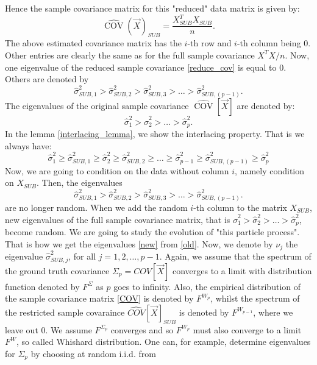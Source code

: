 \documentclass[12pt]{amsart}
\theoremstyle{definition}
\DeclareMathOperator{\Cov}{COV}
\numberwithin{equation}{section}
\numberwithin{equation}{section}
\theoremstyle{remark}
\numberwithin{equation}{section}
\begin{document}
Hence the sample covariance matrix for this
"reduced" data matrix
is given by:
\begin{equation}
\label{reduce_cov}
\hat{\Cov}(\vec{X})_{SUB}=\frac{X_{SUB}^T X_{SUB}}{n}.
\end{equation}
The above estimated covariance matrix has the $i$-th row and $i$-th column
being $0$. Other entries are clearly the same as for the full sample
covariance $X^T X/n$.
Now, one eigenvalue of the reduced sample covariance \ref{reduce_cov} is equal to $0$.
Others are denoted by	
\begin{equation}
\label{old}
\hat{\sigma}^2_{SUB,1}>\hat{\sigma}^2_{SUB,2}>\hat{\sigma}^2_{SUB,3}>\ldots>\hat{\sigma}^2_{SUB,(p-1)}.
\end{equation}
The eigenvalues of the original sample covariance $\hat{\Cov}[\vec{X}]$ are denoted by:
\begin{equation}
\label{new}
\hat{\sigma}^2_1>\hat{\sigma}^2_2>\ldots>\hat{\sigma}^2_p.
\end{equation}
In the lemma \ref{interlacing_lemma}, we show the interlacing property. That is
we always have:
$$\hat{\sigma}^2_1\geq \hat{\sigma}^2_{SUB,1}\geq
\hat{\sigma}^2_2\geq \hat{\sigma}^2_{SUB,2}\geq \ldots\geq
\hat{\sigma}^2_{p-1}\geq \hat{\sigma}^2_{SUB,(p-1)}\geq \hat{\sigma}^2_p
$$
Now, we are going to condition on the data without column $i$, namely condition on $X_{SUB}$. Then, the eigenvalues
$$\hat{\sigma}^2_{SUB,1}>\hat{\sigma}^2_{SUB,2}>\hat{\sigma}^2_{SUB,3}>\ldots>\hat{\sigma}^2_{SUB,(p-1)}.$$
are no longer random. When we add the random $i$-th column to the matrix $X_{SUB}$, new eigenvalues of the full sample covariance matrix, that is
$\hat{\sigma}^2_1>\hat{\sigma}^2_2>\ldots>\hat{\sigma}^2_p$,
become random. We are going to study the evolution of "this particle process".
That is how we get the eigenvalues \ref{new} from \ref{old}.
Now, we denote by $\nu_j$ the eigenvalue $\hat{\sigma}^2_{SUB,j}$,  for all $j=1,2,\ldots,p-1$.
Again, we assume that the spectrum of the ground truth covariance $\Sigma_p=COV[\vec{X}]$ converges to
a limit with distribution function denoted by $F^{\Sigma}$ as $p$ goes to infinity. Also, the empirical distribution of the sample covariance matrix \ref{COV} is denoted by $F^{W_p}$,
whilst the spectrum of the restricted  sample covaraince $\hat{COV}[\vec{X}]_{SUB}$ is denoted by $F^{W_{p-1}}$, where we leave out $0$. We assume $F^{\Sigma_p}$ converges and so $F^{W_p}$ must also converge to a limit $F^W$, so called
Whishard distribution. One can, for example, determine eigenvalues for $\Sigma_p$ by choosing at random i.i.d. from
\end{document}
